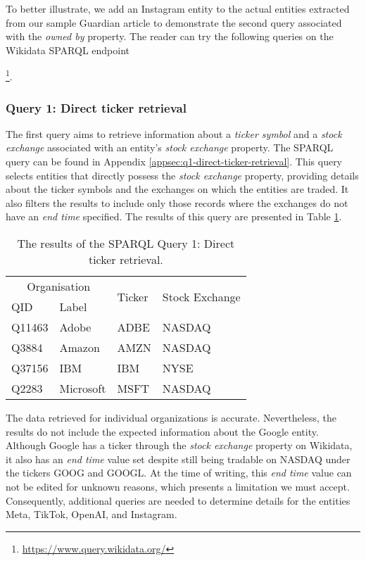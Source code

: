 To better illustrate, we add an Instagram entity to the actual entities extracted from our sample Guardian article to demonstrate the second query associated with the \textit{owned by} property. The reader can try the following queries on the Wikidata SPARQL endpoint{\footnote{\href{https://www.query.wikidata.org/}{https://www.query.wikidata.org/}}.

\subsubsection{Query 1: Direct ticker retrieval}
\label{subsubsec:q1-direct-ticker-retrieval}
The first query aims to retrieve information about a \textit{ticker symbol} and a \textit{stock exchange} associated with an entity's \textit{stock exchange} property. The SPARQL query can be found in Appendix \ref{appsec:q1-direct-ticker-retrieval}. This query selects entities that directly possess the \textit{stock exchange} property, providing details about the ticker symbols and the exchanges on which the entities are traded. It also filters the results to include only those records where the exchanges do not have an \textit{end time} specified. The results of this query are presented in Table \ref{table:sparql_query_1_results}.

\begin{table}[ht]
    \centering
    \caption{The results of the SPARQL Query 1: Direct ticker retrieval.}
    \label{table:sparql_query_1_results}
    \begin{tabular}{l l l l}
    \hline
    \multicolumn{2}{c}{Organisation} & \multirow{2}{*}{Ticker} & \multirow{2}{*}{Stock Exchange}\\
    \cline{1-2}
    QID & Label \\
    \hline
    Q11463 & Adobe & ADBE & NASDAQ \\ 
    Q3884 & Amazon & AMZN & NASDAQ \\ 
    Q37156 & IBM & IBM & NYSE \\ 
    Q2283 & Microsoft & MSFT & NASDAQ \\
    \hline
    \end{tabular}
\end{table}

The data retrieved for individual organizations is accurate. Nevertheless, the results do not include the expected information about the Google entity. Although Google has a ticker through the \textit{stock exchange} property on Wikidata, it also has an \textit{end time} value set despite still being tradable on NASDAQ under the tickers GOOG and GOOGL. At the time of writing, this \textit{end time} value can not be edited for unknown reasons, which presents a limitation we must accept. Consequently, additional queries are needed to determine details for the entities Meta, TikTok, OpenAI, and Instagram.

}
